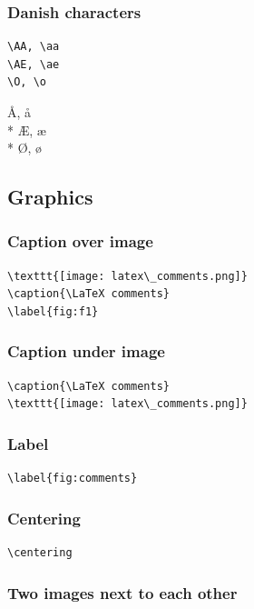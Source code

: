 \subsubsection{Danish characters}
\begin{verbatim}
\AA, \aa
\AE, \ae
\O, \o
\end{verbatim}
\AA, \aa \\*
\AE, \ae \\*
\O, \o

\clearpage

\subsection{Graphics}

\subsubsection{Caption over image}
\begin{verbatim}
\texttt{[image: latex\_comments.png]}
\caption{\LaTeX comments}
\label{fig:f1}
\end{verbatim}

\subsubsection{Caption under image}
\begin{verbatim}
\caption{\LaTeX comments}
\texttt{[image: latex\_comments.png]}
\end{verbatim}

\subsubsection{Label}
\begin{verbatim}
\label{fig:comments}
\end{verbatim}

\subsubsection{Centering}
\begin{verbatim}
\centering
\end{verbatim}

\subsubsection{Two images next to each other}

